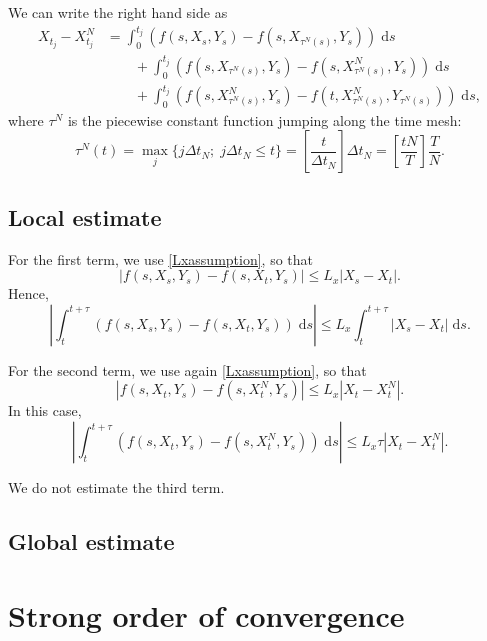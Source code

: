 \documentclass[reqno,12pt]{amsart}
\theoremstyle{plain}%
\theoremstyle{definition}
\begin{document}
We can write the right hand side as
\begin{align*}
    X_{t_j} - X_{t_j}^N & = \int_0^{t_j} \left( f(s, X_s, Y_s) - f(s, X_{\tau^N(s)}, Y_s) \right)\;\mathrm{d}s  \\ 
    & \qquad + \int_{0}^{t_j} \left( f(s, X_{\tau^N(s)}, Y_s) - f(s, X_{\tau^N(s)}^N, Y_s) \right)\;\mathrm{d}s \\
    & \qquad + \int_0^{t_j} \left( f(s, X_{\tau^N(s)}^N, Y_s) - f(t, X_{\tau^N(s)}^N, Y_{\tau^N(s)}) \right)\;\mathrm{d}s,
\end{align*}
where $\tau^N$ is the piecewise constant function jumping along the time mesh:
\begin{equation}
    \label{tauNt}
    \tau^N(t) = \max_j\{j\Delta t_N; \; j\Delta t_N \leq t\} = \left[\frac{t}{\Delta t_N}\right]\Delta t_N = \left[\frac{tN}{T}\right]\frac{T}{N}.
\end{equation}


\subsection{Local estimate}

For the first term, we use \eqref{Lxassumption}, so that
$$
    |f(s, X_s, Y_s) - f(s, X_t, Y_s)| \leq L_x |X_s - X_t|.
$$
Hence,
$$
    \left|\int_t^{t + \tau} \left( f(s, X_s, Y_s) - f(s, X_t, Y_s) \right)\;\mathrm{d}s \right| \leq L_x \int_t^{t+\tau} |X_s - X_t| \;\mathrm{d}s.
$$

For the second term, we use again \eqref{Lxassumption}, so that
$$
    |f(s, X_t, Y_s) - f(s, X_t^N, Y_s)| \leq L_x |X_t - X_t^N|.
$$
In this case,
$$
    \left|\int_t^{t + \tau} \left( f(s, X_t, Y_s) - f(s, X_t^N, Y_s) \right)\;\mathrm{d}s \right| \leq L_x \tau |X_t - X_t^N|.
$$

We do not estimate the third term.

\subsection{Global estimate}


\section{Strong order of convergence}
\end{document}
